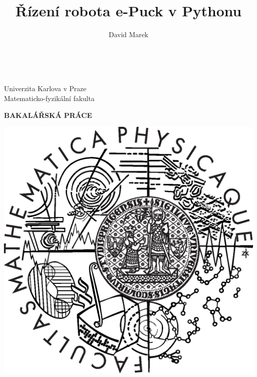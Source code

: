 \documentclass[12pt,notitlepage]{report}
\title{Řízení robota e-Puck v Pythonu}   %
\author{David Marek} %
\begin{document}

\begin{titlepage}
\begin{center}
\ \\

\vspace{15mm}

\large
Univerzita Karlova v Praze\\
Matematicko-fyzikální fakulta\\

\vspace{5mm}

{\Large\bf BAKALÁŘSKÁ PRÁCE}

\vspace{10mm}

\includegraphics[scale=0.3]{logo.eps}


\end{center}
\end{titlepage}
\end{document}
